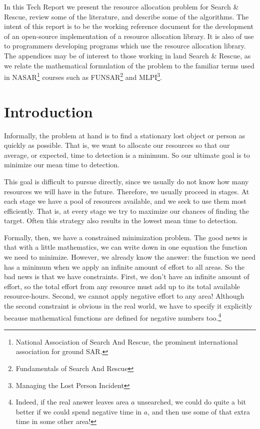 
In this Tech Report we present the resource allocation problem for
Search \& Rescue, review some of the literature, and describe some of
the algorithms. The intent of this report is to be the working
reference document for the development of an open-source
implementation of a resource allocation library. It is also of use to
programmers developing programs which use the resource allocation
library. The appendices may be of interest to those working in land Search \&
Rescue, as we relate the mathematical formulation of the problem to
the familiar terms used in NASAR\footnote{National Association of
  Search And Rescue, the prominent international association for
  ground SAR.} courses such as FUNSAR\footnote{Fundamentals of Search
  And Rescue} and MLPI\footnote{Managing the Lost Person Incident}.



\section{Introduction}
\label{sec:intro}
Informally, the problem at hand is to find a stationary lost object or
person as quickly as possible. That is, we want to allocate our
resources so that our average, or expected, time to detection is a
minimum. So our ultimate goal is to minimize our mean time to
detection.

This goal is difficult to pursue directly, since we usually do not
know how many resources we will have in the future. Therefore, we
usually proceed in stages. At each stage we have a pool of resources
available, and we seek to use them most efficiently. That is, at every
stage we try to maximize our chances of finding the target. Often this
strategy also results in the lowest mean time to detection.

Formally, then, we have a constrained minimization problem. The good
news is that with a little mathematics, we can write down in one
equation the function we need to minimize. However, we already know
the answer: the function we need has a minimum when we apply an
infinite amount of effort to all areas. So the bad news is that we
have constraints. First, we don't have an infinite amount of effort,
so the total effort from any resource must add up to its total
available resource-hours. Second, we cannot apply negative effort to
any area! Although the second constraint is obvious in the real world,
we have to specify it explicitly because mathematical functions are
defined for negative numbers too.\footnote{Indeed, if the real answer
  leaves area $a$ unsearched, we could do quite a bit better if we
  could spend negative time in $a$, and then use some of that extra
  time in some other area!}


